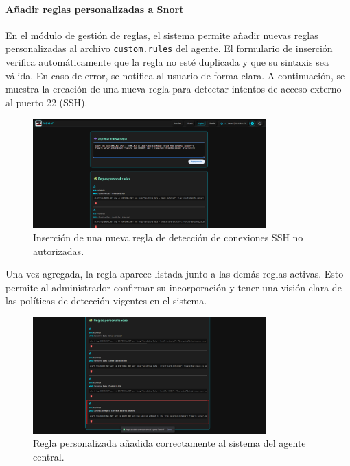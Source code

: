 \documentclass[11pt,a4paper,twoside]{report}
\begin{document}
\paragraph{Añadir reglas personalizadas a Snort}

En el módulo de gestión de reglas, el sistema permite añadir nuevas reglas personalizadas al archivo \texttt{custom.rules} del agente. El formulario de inserción verifica automáticamente que la regla no esté duplicada y que su sintaxis sea válida. En caso de error, se notifica al usuario de forma clara. A continuación, se muestra la creación de una nueva regla para detectar intentos de acceso externo al puerto 22 (SSH).

\begin{figure}[H]
	\centering
	\includegraphics[width=0.8\textwidth]{pruebas/5.png}
	\caption{Inserción de una nueva regla de detección de conexiones SSH no autorizadas.}
	\label{fig:insertar_regla_ssh}
\end{figure}

Una vez agregada, la regla aparece listada junto a las demás reglas activas. Esto permite al administrador confirmar su incorporación y tener una visión clara de las políticas de detección vigentes en el sistema.

\begin{figure}[H]
	\centering
	\includegraphics[width=0.8\textwidth]{pruebas/6.png}
	\caption{Regla personalizada añadida correctamente al sistema del agente central.}
	\label{fig:regla_ssh_insertada}
\end{figure}
\end{document}
